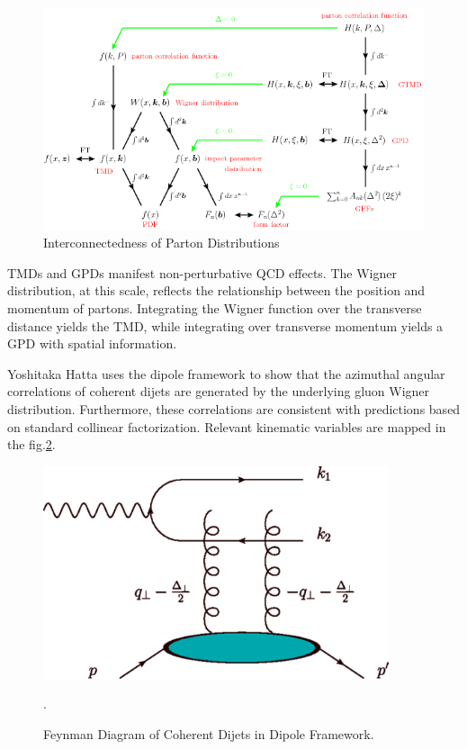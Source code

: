 \begin{figure}[h!]
\begin{centering}
\includegraphics[width=7in]{Chapter2/importfigs/fig6_introGPD_TMD.png}
\par\end{centering}
\caption{Interconnectedness of Parton Distributions \label{fig:gpdTMDWeb}}
\end{figure}

TMDs and GPDs manifest non-perturbative QCD effects. The Wigner distribution, at this scale, reflects the relationship between the position and momentum of partons. Integrating the Wigner function over the transverse distance yields the TMD, while integrating over transverse momentum yields a GPD with spatial information. 

Yoshitaka Hatta uses the dipole framework to show that the azimuthal angular correlations of coherent dijets are generated by the underlying gluon Wigner distribution. Furthermore, these correlations are consistent with predictions based on standard collinear factorization. Relevant kinematic variables are mapped in the fig.\ref{fig:yatta1}.

\begin{figure}[h!]
\begin{centering}
\includegraphics[width=4in]{Chapter2/importfigs/fig4_yatta.png}
\par\end{centering}
\caption{Feynman Diagram of Coherent Dijets in Dipole Framework. \label{fig:yatta1}}.
\end{figure}




